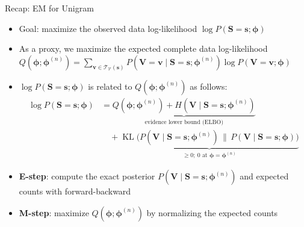 \documentclass[11pt,compress,t,notes=noshow, xcolor=table]{beamer}
\newcommand{\vocab}{\mathcal{V}}
\newcommand{\probs}{\boldsymbol{\phi}}
\begin{document}
\begin{frame}{Recap: EM for Unigram}
 
\vfill
 
\begin{itemize}
\item Goal: maximize the observed data log-likelihood $\log P(\mathbf{S} = \mathbf{s}; \probs)$
\item As a proxy, we maximize the expected complete data log-likelihood $Q(\probs; \probs^{(n)}) =  \sum_{\mathbf{v} \in \mathcal{T}_{\vocab}(\mathbf{s})} P(\mathbf{V} = \mathbf{v} \mid \mathbf{S} = \mathbf{s}; \probs^{(n)}) \log P(\mathbf{V} = \mathbf{v}; \probs)$

\item $\log P(\mathbf{S} = \mathbf{s}; \probs)$ is related to $Q(\probs; \probs^{(n)})$ as follows:
\begin{align*}
\log P(\mathbf{S} = \mathbf{s}; \probs) &= \underbrace{Q(\probs; \probs^{(n)}) + H(\mathbf{V} \mid \mathbf{S} = \mathbf{s}; \probs^{(n)})}_{\text{evidence lower bound (ELBO)}}\\
&\quad + \underbrace{\operatorname{KL}\big(P(\mathbf{V} \mid \mathbf{S} = \mathbf{s}; \probs^{(n)}) \,\big\|\, P(\mathbf{V} \mid \mathbf{S} = \mathbf{s}; \probs)\big)}_{\geq 0;\ 0 \text{ at } \probs = \probs^{(n)}}
\end{align*}
\item \textbf{E-step}: compute the exact posterior $P(\mathbf{V} \mid \mathbf{S} = \mathbf{s}; \probs^{(n)})$ and expected counts with forward-backward
\item \textbf{M-step}: maximize $Q(\probs; \probs^{(n)})$ by normalizing the expected counts
\end{itemize}
 
\vfill
 
\end{frame}
\end{document}
